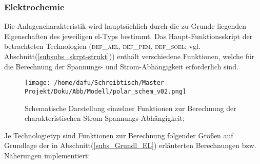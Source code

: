 \documentclass[onecolumn,10pt,titlepage]{article}
\begin{document}



\subsubsection{Elektrochemie}
\label{subsubs_mod_elchem}


Die Anlagencharakteristik wird hauptsächlich durch die zu Grunde liegenden Eigenschaften des jeweiligen \gls{el}-Typs bestimmt. 
Das Haupt-Funktionsskript der betrachteten Technologien   (\textsc{def\_ael}, \textsc{def\_pem}, \textsc{def\_soel}; vgl. Abschnitt(\ref{subsubs_skrpt-strukt})) enthält verschiedene Funktionen, welche für die Berechnung der Spannungs- und Strom-Abhängigkeit erforderlich sind.\\
\begin{figure}[H]
	
	\centering
	\texttt{[image: /home/dafu/Schreibtisch/Master-Projekt/Doku/Abb/Modell/polar\_schem\_v02.png]}
	\caption[Schematische Darstellung zur Berechnung Strom-Spannungs-Abhängigkeit]{Schematische Darstellung einzelner Funktionen zur Berechnung der charakteristischen Strom-Spannungs-Abhängigkeit; }
	\label{fig:schem_polar} 
\end{figure}
%	
Je Technologietyp sind Funktionen zur Berechnung folgender Größen auf Grundlage der in  Abschnitt(\ref{subs_Grundl_EL}) erläuterten Berechnungen bzw. Näherungen implementiert:\\
\end{document}
